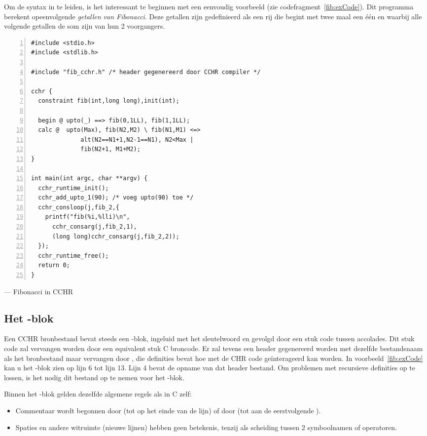 Om de syntax in te leiden, is het interessant te beginnen met een eenvoudig voorbeeld (zie codefragment~\ref{fib:exCode}). Dit programma berekent opeenvolgende {\em getallen van Fibonacci}. Deze getallen zijn gedefinieerd als een rij die begint met twee maal een \'e\'en en waarbij alle volgende getallen de som zijn van hun 2 voorgangers.

\begin{exCode}
\begin{Verbatim}[frame=single,numbers=left]
#include <stdio.h>
#include <stdlib.h>

#include "fib_cchr.h" /* header gegenereerd door CCHR compiler */

cchr {
  constraint fib(int,long long),init(int);

  begin @ upto(_) ==> fib(0,1LL), fib(1,1LL);
  calc @  upto(Max), fib(N2,M2) \ fib(N1,M1) <=>
              alt(N2==N1+1,N2-1==N1), N2<Max |
              fib(N2+1, M1+M2);
}

int main(int argc, char **argv) {
  cchr_runtime_init();
  cchr_add_upto_1(90); /* voeg upto(90) toe */
  cchr_consloop(j,fib_2,{
    printf("fib(%i,%lli)\n", 
      cchr_consarg(j,fib_2,1),
      (long long)cchr_consarg(j,fib_2,2));
  });
  cchr_runtime_free();
  return 0;
}
\end{Verbatim}
\caption{\label{fib:exCode}  --- Fibonacci in CCHR}
\end{exCode}

\subsection{Het -blok}

Een CCHR bronbestand bevat steeds een -blok, ingeluid met het sleutelwoord  en gevolgd door een stuk code tussen accolades. Dit stuk code zal vervangen worden door een equivalent stuk C broncode. Er zal tevens een header gegenereerd worden met dezelfde bestandsnaam als het bronbestand maar  vervangen door , die definities bevat hoe met de CHR code ge\"interageerd kan worden. In voorbeeld~\ref{fib:exCode} kan u het -blok zien op lijn 6 tot lijn 13. Lijn 4 bevat de opname van dat header bestand. Om problemen met recursieve definities op te lossen, is het nodig dit bestand op te nemen voor het -blok.

Binnen het -blok gelden dezelfde algemene regels als in C zelf: \begin{itemize}
  \item Commentaar wordt begonnen door \code{//} (tot op het einde van de lijn) of door \code{/*} (tot aan de eerstvolgende \code{*/}).
  \item Spaties en andere witruimte (nieuwe lijnen) hebben geen betekenis, tenzij als scheiding tussen 2 symboolnamen of operatoren.
\end{itemize}

